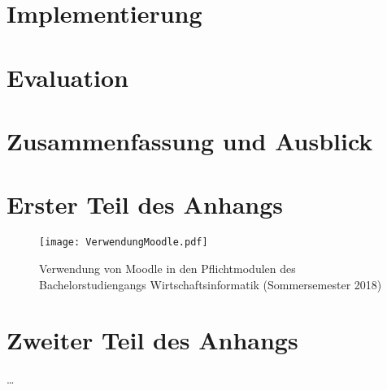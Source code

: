 \documentclass[twoside,bibliography=totoc,openany]{fumi}
\begin{document}
\chapter{Implementierung}




\chapter{Evaluation}



\chapter{Zusammenfassung und Ausblick}



\appendix

\chapter{Erster Teil des Anhangs}
\begin{sidewaysfigure}
\texttt{[image: VerwendungMoodle.pdf]}
\caption{\label{fig:VerwendungMoodle} Verwendung von Moodle in den Pflichtmodulen des Bachelorstudiengangs Wirtschaftsinformatik (Sommersemester 2018)}
\end{sidewaysfigure}

\chapter{Zweiter Teil des Anhangs}
\dots




\backmatter
\pagestyle{fancyclear}



{\footnotesize\flushleft\setlength{\itemsep}{-3pt}%

}
\cleardoublepage


\listoffigures
\cleardoublepage


\listoftables
\cleardoublepage
\end{document}
